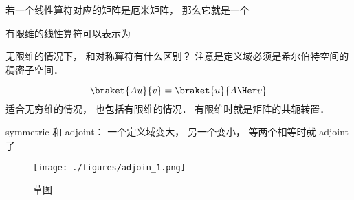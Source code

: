 
\begin{issues}
\issueDraft
\end{issues}



若一个线性算符对应的矩阵是厄米矩阵， 那么它就是一个

有限维的线性算符可以表示为

无限维的情况下， 和对称算符有什么区别？ 注意是定义域必须是希尔伯特空间的稠密子空间．


\begin{equation}
\braket{Au}{v} = \braket{u}{A\Her v}
\end{equation}
适合无穷维的情况， 也包括有限维的情况． 有限维时就是矩阵的共轭转置．

symmetric 和 adjoint： 一个定义域变大， 另一个变小， 等两个相等时就 adjoint 了
\begin{figure}[ht]
\centering
\texttt{[image: ./figures/adjoin\_1.png]}
\caption{草图} \label{adjoin_fig1}
\end{figure}

